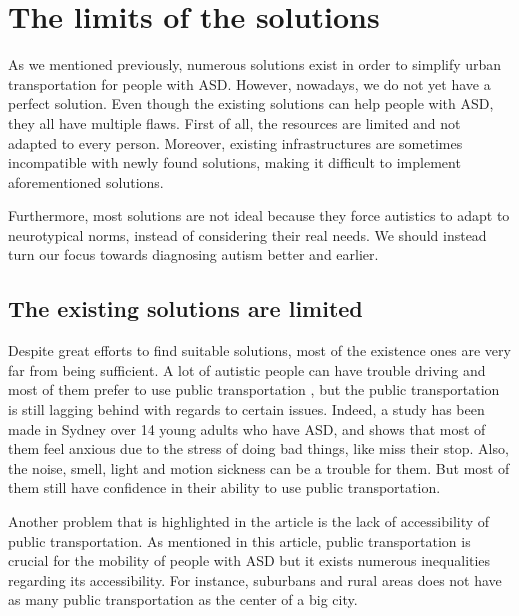 \section{The limits of the solutions}

As we mentioned previously, numerous solutions exist in order to simplify urban transportation for people with ASD. However, nowadays, we do not yet have a perfect solution. Even though the existing solutions can help people with ASD, they all have multiple flaws. First of all, the resources are limited and not adapted to every person. Moreover, existing infrastructures are sometimes incompatible with newly found solutions, making it difficult to implement aforementioned solutions.

Furthermore, most solutions are not ideal because they force autistics to adapt to neurotypical norms, instead of considering their real needs. We should instead turn our focus towards diagnosing autism better and earlier.

\subsection{The existing solutions are limited}
Despite great efforts to find suitable solutions, most of the existence ones are very far from being sufficient. A lot of autistic people can have trouble driving and most of them prefer to use public transportation \cite{2015ViewpointsAdultsAutism} \cite{2021DevelopingCommunityMobility}, but the public transportation is still lagging behind with regards to certain issues. Indeed, a study has been made in Sydney \cite{2020ExperiencesYoungAutistic} over 14 young adults who have ASD, and shows that most of them feel anxious due to the stress of doing bad things, like miss their stop. Also, the noise, smell, light and motion sickness can be a trouble for them. But most of them still have confidence in their ability to use public transportation.

Another problem that is highlighted in the article \cite{2015DetourRightPlace} is the lack of accessibility of public transportation. As mentioned in this article, public transportation is crucial for the mobility of people with ASD but it exists numerous inequalities regarding its accessibility. For instance, suburbans and rural areas does not have as many public transportation as the center of a big city.

